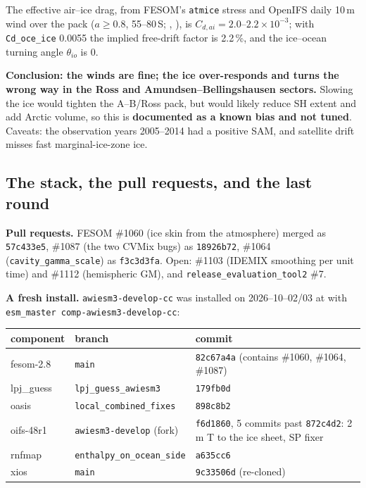 \documentclass[10pt]{article}
\begin{document}
The effective air--ice drag, from FESOM's \texttt{atmice} stress and OpenIFS daily 10\,m wind over
the pack ($a\geq0.8$, 55--80\,S; ,
), is $C_{d,ai}=2.0$--$2.2\times10^{-3}$; with
\texttt{Cd\_oce\_ice} 0.0055 the implied free-drift factor is 2.2\,\%, and the ice--ocean turning
angle $\theta_{io}$ is 0.

\textbf{Conclusion: the winds are fine; the ice over-responds and turns the wrong way in the Ross
and Amundsen--Bellingshausen sectors.} Slowing the ice would tighten the A--B/Ross pack, but would
likely reduce SH extent and add Arctic volume, so this is \textbf{documented as a known bias and
not tuned}. Caveats: the observation years 2005--2014 had a positive SAM, and satellite drift misses
fast marginal-ice-zone ice.

\subsection{The stack, the pull requests, and the last round}\label{sub:r45stack}

\textbf{Pull requests.} FESOM \#1060 (ice skin from the atmosphere) merged as \texttt{57c433e5},
\#1087 (the two CVMix bugs) as \texttt{18926b72}, \#1064 (\texttt{cavity\_gamma\_scale}) as
\texttt{f3c3d3fa}. Open: \#1103 (IDEMIX smoothing per unit time) and \#1112 (hemispheric GM), and
\texttt{release\_evaluation\_tool2} \#7.

\textbf{A fresh install.} \texttt{awiesm3-develop-cc} was installed on 2026--10--02/03 at
 with \texttt{esm\_master
comp-awiesm3-develop-cc}:

\begin{center}\small
\begin{tabular}{lll}
\toprule
component & branch & commit \\
\midrule
fesom-2.8   & \texttt{main} & \texttt{82c67a4a} (contains \#1060, \#1064, \#1087) \\
lpj\_guess  & \texttt{lpj\_guess\_awiesm3} & \texttt{179fb0d} \\
oasis       & \texttt{local\_combined\_fixes} & \texttt{898c8b2} \\
oifs-48r1   & \texttt{awiesm3-develop} (fork) & \texttt{f6d1860}, 5 commits past \texttt{872c4d2}: 2\,m T to the ice sheet, SP fixer \\
rnfmap      & \texttt{enthalpy\_on\_ocean\_side} & \texttt{a635cc6} \\
xios        & \texttt{main} & \texttt{9c33506d} (re-cloned) \\
\bottomrule
\end{tabular}
\end{center}
\end{document}
